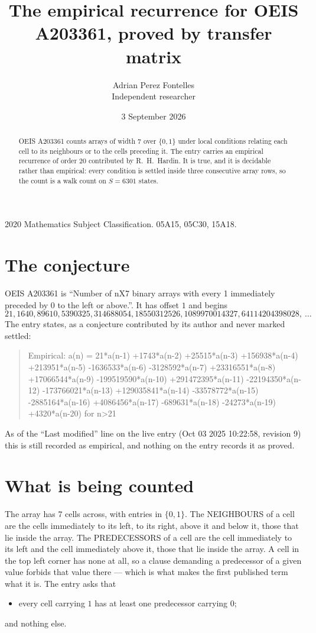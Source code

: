 \documentclass[11pt,a4paper]{article}
\title{The empirical recurrence for OEIS A203361, proved by transfer matrix}
\author{Adrian Perez Fontelles\\ \small Independent researcher}
\date{3 September 2026}
\theoremstyle{plain}
\theoremstyle{definition}
\begin{document}
\maketitle

\begin{abstract}
OEIS A203361 counts arrays of width $7$ over $\{0,1\}$ under local conditions relating each cell
to its neighbours or to the cells preceding it. The entry carries an empirical recurrence of
order $20$ contributed by R.~H.~Hardin. It is true, and it is decidable rather than
empirical: every condition is settled inside three consecutive array rows, so the count is a
walk count on $S=6301$ states.
\end{abstract}

\noindent\small 2020 Mathematics Subject Classification. 05A15, 05C30, 15A18.\normalsize

\section{The conjecture}

OEIS A203361 is ``Number of nX7 binary arrays with every 1 immediately preceded by 0 to the left or above.''. It has offset $1$ and begins
\[
21, 1640, 89610, 5390325, 314688054, 18550312526, 1089970014327, 64114204398028,\ \dots
\]
The entry states, as a conjecture contributed by its author and never marked settled:
\begin{quote}
Empirical: a(n) = 21*a(n-1) +1743*a(n-2) +25515*a(n-3) +156938*a(n-4) +213951*a(n-5) -1636533*a(n-6) -3128592*a(n-7) +23316551*a(n-8) +17066544*a(n-9) -199519590*a(n-10) +291472395*a(n-11) -22194350*a(n-12) -173766021*a(n-13) +129035841*a(n-14) -33578772*a(n-15) -2885164*a(n-16) +4086456*a(n-17) -689631*a(n-18) -24273*a(n-19) +4320*a(n-20) for n>21
\end{quote}
As of the ``Last modified'' line on the live entry (Oct 03 2025 10:22:58, revision 9) this is still
recorded as empirical, and nothing on the entry records it as proved.

\section{What is being counted}

The array has $7$ cells across, with entries in $\{0,1\}$. The NEIGHBOURS of a cell are the
cells immediately to its left, to its right, above it and below it, those that lie inside the
array. The PREDECESSORS of a cell are the cell immediately to its left and the cell
immediately above it, those that lie inside the array. A cell in the top left corner has none
at all, so a clause demanding a predecessor of a given value forbids that value there --- which
is what makes the first published term what it is. The entry asks that
\begin{itemize}
\item every cell carrying $1$ has at least one predecessor carrying $0$;
\end{itemize}
and nothing else.
\end{document}
